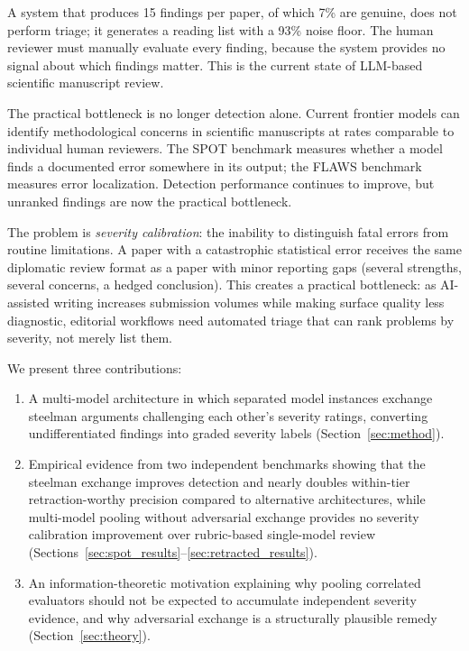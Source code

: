 \documentclass{ws-ijprai}
\begin{document}
A system that produces 15 findings per paper, of which 7\% are genuine,
does not perform triage; it generates a reading list with a 93\% noise floor.
The human reviewer must manually evaluate every finding, because the system
provides no signal about which findings matter. This is the current
state of LLM-based scientific manuscript review.

The practical bottleneck is no longer detection alone. Current frontier models
can identify methodological concerns in scientific manuscripts at rates
comparable to individual human reviewers.\cite{liang2024feedback} The SPOT
benchmark\cite{son2025spot} measures whether a model finds a documented error
somewhere in its output; the FLAWS benchmark\cite{xi2025flaws}
measures error localization. Detection performance continues to improve, but
unranked findings are now the practical bottleneck.

The problem is \emph{severity calibration}: the inability to distinguish fatal
errors from routine limitations. A paper with a catastrophic statistical error
receives the same diplomatic review format as a paper with minor reporting
gaps (several strengths, several concerns, a hedged
conclusion).\cite{brilliant2026selfcorrection} This creates a practical
bottleneck: as AI-assisted writing increases submission volumes while making
surface quality less diagnostic,\cite{kobak2025llm} editorial workflows need
automated triage that can rank problems by severity, not merely list them.

We present three contributions:

\begin{enumerate}
\item A multi-model architecture in which separated model instances
exchange steelman arguments challenging each other's severity ratings,
converting undifferentiated findings into graded severity labels
(Section~\ref{sec:method}).

\item Empirical evidence from two independent benchmarks showing that
the steelman exchange improves detection and nearly doubles within-tier
retraction-worthy precision compared to alternative architectures, while
multi-model pooling without adversarial exchange provides no severity
calibration improvement over rubric-based single-model review
(Sections~\ref{sec:spot_results}--\ref{sec:retracted_results}).

\item An information-theoretic motivation explaining why pooling
correlated evaluators should not be expected to accumulate independent severity
evidence, and why adversarial exchange is a structurally plausible remedy
(Section~\ref{sec:theory}).
\end{enumerate}
\end{document}
